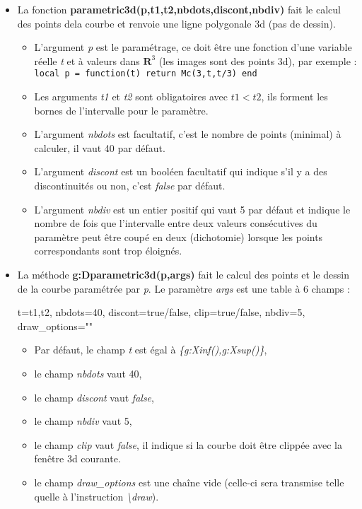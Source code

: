 \begin{itemize}
\item La fonction \textbf{parametric3d(p,t1,t2,nbdots,discont,nbdiv)} fait le calcul des points dela courbe et renvoie une ligne polygonale 3d (pas de dessin).
  \begin{itemize}
    \item L'argument \emph{p} est le paramétrage, ce doit être une fonction d'une variable réelle \emph{t} et à valeurs dans $\mathbf R^3$ (les images sont des points 3d), par exemple :
    \texttt{local p = function(t) return Mc(3,t,t/3) end}
    
    \item  Les arguments \emph{t1} et \emph{t2} sont obligatoires avec \(t1 < t2\), ils forment les bornes de l'intervalle pour le paramètre.
    
    \item L'argument \emph{nbdots} est facultatif, c'est le nombre de points (minimal) à calculer, il vaut 40 par défaut.
    
    \item L'argument \emph{discont} est un booléen facultatif qui indique s'il y a des discontinuités ou non, c'est \emph{false} par défaut.
    
    \item L'argument \emph{nbdiv} est un entier positif qui vaut 5 par défaut et indique le nombre de fois que l'intervalle entre deux valeurs consécutives du paramètre peut être coupé en deux (dichotomie) lorsque les points correspondants sont trop éloignés.
  \end{itemize}
  
\item La méthode \textbf{g:Dparametric3d(p,args)} fait le calcul des points et le dessin de la courbe paramétrée par \emph{p}. Le paramètre \emph{args} est une table à 6 champs :

\begin{TeXcode}
 { t={t1,t2}, nbdots=40, discont=true/false, clip=true/false, nbdiv=5, draw_options="" }
\end{TeXcode}

  \begin{itemize}
      \item Par défaut, le champ \emph{t} est égal à \emph{\{g:Xinf(),g:Xsup()\}},
      \item le champ \emph{nbdots} vaut 40, 
      \item le champ \emph{discont} vaut \emph{false},
      \item le champ \emph{nbdiv} vaut 5,
      \item le champ \emph{clip} vaut \emph{false}, il indique si la courbe doit être clippée avec la fenêtre 3d courante.
      \item le champ \emph{draw\_options} est une chaîne vide (celle-ci sera transmise telle quelle à l'instruction \emph{\textbackslash draw}).
  \end{itemize}
\end{itemize} 

